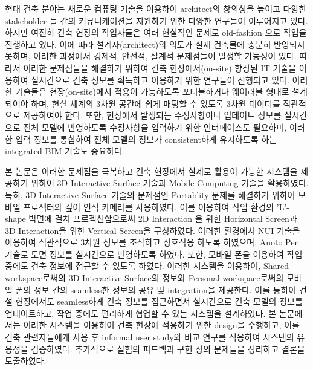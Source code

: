 현대 건축 분야는 새로운 컴퓨팅 기술을 이용하여 architect의 창의성을 높이고 다양한 stakeholder 들 간의 커뮤니케이션을 지원하기 위한 다양한 연구들이 이루어지고 있다. 하지만 여전히 건축 현장의 작업자들은 여러 현실적인 문제로 old-fashion 으로 작업을 진행하고 있다\cite{behzadan_visualization_2005}. 이에 따라 설계자(architect)의 의도가 실제 건축물에 충분히 반영되지 못하며, 이러한 과정에서 경제적, 안전적, 설계적 문제점들이 발생할 가능성이 있다. 따라서 이러한 문제점들을 해결하기 위하여 건축 현장에서(on-site) 향상된 IT 기술을 이용하여 실시간으로 건축 정보를 획득하고 이용하기 위한 연구들이 진행되고 있다. 이러한 기술들은 현장(on-site)에서 적용이 가능하도록 포터블하거나 웨어러블 형태로 설계되어야 하며\cite{song_penlight:_2009, yeh_-site_2012}, 현실 세계의 3차원 공간에 쉽게 매핑할 수 있도록 3차원 데이터를 직관적으로 제공하여야 한다\cite{chi_research_2013, kim_interactive_2012, yeh_-site_2012}. 또한, 현장에서 발생되는 수정사항이나 업데이트 정보를 실시간으로 전체 모델에 반영하도록 수정사항을 입력하기 위한 인터페이스도 필요하며\cite{song_penlight:_2009}, 이러한 입력 정보를 통합하여 전체 모델의 정보가 consistent하게 유지하도록 하는 integrated BIM 기술도 중요하다.

본 논문은 이러한 문제점을 극복하고 건축 현장에서 실제로 활용이 가능한 시스템을 제공하기 위하여 3D Interactive Surface 기술\cite{grossman__2010}과 Mobile Computing 기술을 활용하였다. 특히, 3D Interactive Surface 기술의 문제점인 Portablity 문제를 해결하기 위하여 모바일 프로젝터와 깊이 인식 카메라를 사용하였다. 이를 이용하여 작업 환경의 'L'-shape 벽면에 걸쳐 프로젝션함으로써 2D Interaction 을 위한 Horizontal Screen과 3D Interaction을 위한 Vertical Screen을 구성하였다. 이러한 환경에서 NUI 기술을 이용하여 직관적으로 3차원 정보를 조작하고 상호작용 하도록 하였으며, Anoto Pen 기술로 도면 정보를 실시간으로 반영하도록 하였다. 또한, 모바일 폰을 이용하여 작업 중에도 건축 정보에 접근할 수 있도록 하였다. 이러한 시스템을 이용하여, Shared workspace로써의 3D Interactive Surface의 정보와 Personal workspace로써의 모바일 폰의 정보 간의 seamless한 정보의 공유 및 integration을 제공한다. 이를 통하여 건설 현장에서도 seamless하게 건축 정보를 접근하면서 실시간으로 건축 모델의 정보를 업데이트하고, 작업 중에도 편리하게 협업할 수 있는 시스템을 설계하였다. 본 논문에서는 이러한 시스템을 이용하여 건축 현장에 적용하기 위한 design을 수행하고, 이를 건축 관련자들에게 사용 후 informal user study와 비교 연구를 적용하여 시스템의 유용성을 검증하였다. 추가적으로 실험의 피드백과 구현 상의 문제들을 정리하고 결론을 도출하였다.